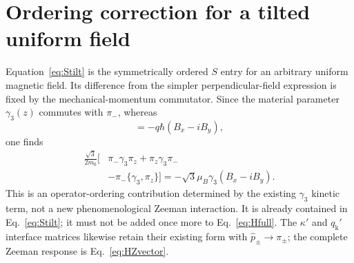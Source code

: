 \section{Ordering correction for a tilted uniform field}
\label{app:tilted}

Equation~\eqref{eq:Stilt} is the symmetrically ordered $S$ entry for an arbitrary uniform magnetic field. Its difference from the simpler perpendicular-field expression is fixed by the mechanical-momentum commutator. Since the material parameter $\gamma_3(z)$ commutes with $\pi_-$, whereas
\begin{equation}
[\pi_z,\pi_-]=-q\hbar(B_x-iB_y),
\label{eq:tiltcommutator}
\end{equation}
one finds
\begin{equation}
\begin{aligned}
\frac{\sqrt3}{2m_0}\bigl[
&\pi_-\gamma_3\pi_z+\pi_z\gamma_3\pi_-\\
&-\pi_-\{\gamma_3,\pi_z\}\bigr]
=-\sqrt3\mu_B\gamma_3(B_x-iB_y).
\end{aligned}
\label{eq:Stiltdifference}
\end{equation}
This is an operator-ordering contribution determined by the existing $\gamma_3$ kinetic term, not a new phenomenological Zeeman interaction. It is already contained in Eq.~\eqref{eq:Stilt}; it must not be added once more to Eq.~\eqref{eq:Hfull}. The $\kappa'$ and $q_{\mathrm k}'$ interface matrices likewise retain their existing form with $ \hat{p}_ \pm\to\pi_\pm$; the complete Zeeman response is Eq.~\eqref{eq:HZvector}.

